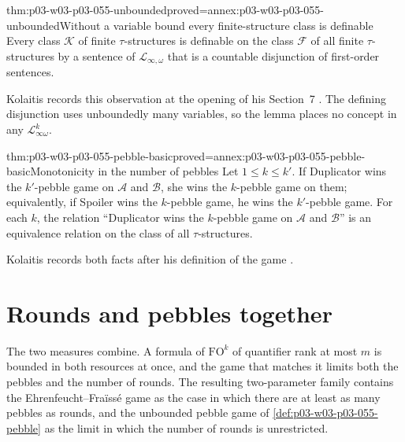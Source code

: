 \begin{hblemma}{thm:p03-w03-p03-055-unbounded}{proved=annex:p03-w03-p03-055-unbounded}{Without a variable bound every finite-structure class is definable}
Every class \(\mathcal K\) of finite \(\tau\)-structures is definable on the
class \(\mathcal F\) of all finite \(\tau\)-structures by a sentence of
\(\mathcal L_{\infty,\omega}\) that is a countable disjunction of
first-order sentences.
\end{hblemma}

Kolaitis records this observation at the opening of his Section~7
\cite[p.~52]{Kolaitis2003ExpressivePowerNotes}. The defining disjunction
uses unboundedly many variables, so the lemma places no concept in any
\(\mathcal L^k_{\infty\omega}\).

\begin{hblemma}{thm:p03-w03-p03-055-pebble-basic}{proved=annex:p03-w03-p03-055-pebble-basic}{Monotonicity in the number of pebbles}
Let \(1\le k\le k'\). If Duplicator wins the \(k'\)-pebble game on
\(\mathcal A\) and \(\mathcal B\), she wins the \(k\)-pebble game on them;
equivalently, if Spoiler wins the \(k\)-pebble game, he wins the
\(k'\)-pebble game. For each \(k\), the relation ``Duplicator wins the
\(k\)-pebble game on \(\mathcal A\) and \(\mathcal B\)'' is an equivalence
relation on the class of all \(\tau\)-structures.
\end{hblemma}

Kolaitis records both facts after his definition of the game
\cite[p.~56]{Kolaitis2003ExpressivePowerNotes}.

\section{Rounds and pebbles together}
\label{sec:p03-w03-p03-055-bounded}

The two measures combine. A formula of \(\mathrm{FO}^k\) of quantifier rank
at most \(m\) is bounded in both resources at once, and the game that
matches it limits both the pebbles and the number of rounds. The resulting
two-parameter family contains the Ehrenfeucht--Fra\"iss\'e game as the case
in which there are at least as many pebbles as rounds, and the unbounded
pebble game of \cref{def:p03-w03-p03-055-pebble} as the limit in which the
number of rounds is unrestricted.

